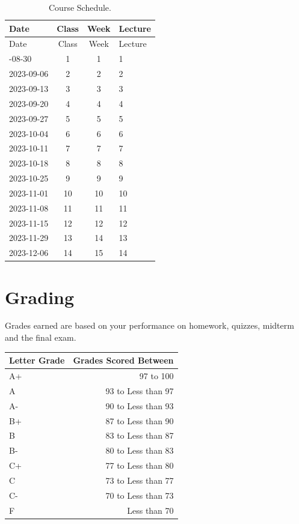 \documentclass[11pt,]{article}
\begin{document}
\begin{longtable}[]{@{}lccl@{}}
\caption{Course Schedule.}\tabularnewline
\toprule\noalign{}
Date & Class & Week & Lecture \\
\midrule\noalign{}
\endfirsthead
\toprule\noalign{}
Date & Class & Week & Lecture \\
\midrule\noalign{}
\endhead
\bottomrule\noalign{}
\endlastfoot
2023-08-30 & 1 & 1 & 1 \\
2023-09-06 & 2 & 2 & 2 \\
2023-09-13 & 3 & 3 & 3 \\
2023-09-20 & 4 & 4 & 4 \\
2023-09-27 & 5 & 5 & 5 \\
2023-10-04 & 6 & 6 & 6 \\
2023-10-11 & 7 & 7 & 7 \\
2023-10-18 & 8 & 8 & 8 \\
2023-10-25 & 9 & 9 & 9 \\
2023-11-01 & 10 & 10 & 10 \\
2023-11-08 & 11 & 11 & 11 \\
2023-11-15 & 12 & 12 & 12 \\
2023-11-29 & 13 & 14 & 13 \\
2023-12-06 & 14 & 15 & 14 \\
\end{longtable}

\hypertarget{grading}{%
\section{Grading}\label{grading}}

Grades earned are based on your performance on homework, quizzes,
midterm and the final exam.

\begin{longtable}[]{@{}lr@{}}
\toprule\noalign{}
Letter Grade & Grades Scored Between \\
\midrule\noalign{}
\endhead
\bottomrule\noalign{}
\endlastfoot
A+ & 97 to 100 \\
A & 93 to Less than 97 \\
A- & 90 to Less than 93 \\
B+ & 87 to Less than 90 \\
B & 83 to Less than 87 \\
B- & 80 to Less than 83 \\
C+ & 77 to Less than 80 \\
C & 73 to Less than 77 \\
C- & 70 to Less than 73 \\
F & Less than 70 \\
\end{longtable}
\end{document}
